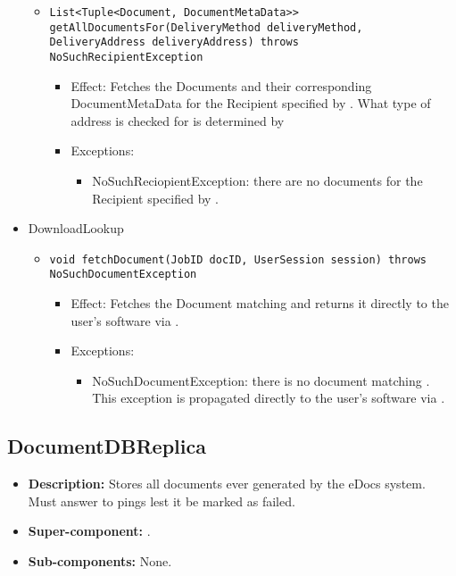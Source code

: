 \begin{itemize}
\begin{itemize}
		\item \texttt{List<Tuple<Document, DocumentMetaData>> getAllDocumentsFor(DeliveryMethod deliveryMethod, DeliveryAddress deliveryAddress) throws NoSuchRecipientException}
		\begin{itemize}
			\item Effect: Fetches the Documents and their corresponding DocumentMetaData for the Recipient specified by . What type of address is checked for is determined by 
			\item Exceptions: 
			\begin{itemize}
				\item NoSuchReciopientException: there are no documents for the Recipient specified by .
			\end{itemize}
		\end{itemize}
	\end{itemize}

    \item DownloadLookup
	\begin{itemize}
		\item \texttt{void fetchDocument(JobID docID, UserSession session) throws NoSuchDocumentException}
		\begin{itemize}
			\item Effect: Fetches the Document matching  and returns it directly to the user's software via .
			\item Exceptions:
			\begin{itemize}
				\item NoSuchDocumentException: there is no document matching . This exception is propagated directly to the user's software via .
			\end{itemize}
		\end{itemize}
	\end{itemize}
\end{itemize}

\subsection{DocumentDBReplica}
\begin{itemize}
    \item \textbf{Description:} Stores all documents ever generated by the eDocs system. Must answer to pings lest it be marked as failed.
    \item \textbf{Super-component:} .
    \item \textbf{Sub-components:} None.
\end{itemize}

